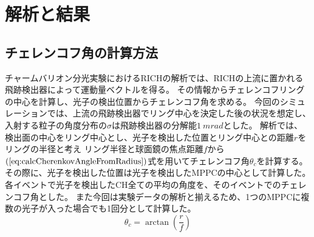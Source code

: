 \section{解析と結果}

\subsection{チェレンコフ角の計算方法}
チャームバリオン分光実験におけるRICHの解析では、RICHの上流に置かれる飛跡検出器によって運動量ベクトルを得る。
その情報からチェレンコフリングの中心を計算し、光子の検出位置からチェレンコフ角を求める。
今回のシミュレーションでは、上流の飛跡検出器でリング中心を決定した後の状況を想定し、
入射する粒子の角度分布の$\sigma$は飛跡検出器の分解能$\SI{1}{mrad}$とした。
解析では、検出面の中心をリング中心とし、光子を検出した位置とリング中心との距離$r$をリングの半径と考え
リング半径と球面鏡の焦点距離$f$から$(\ref{eq:calcCherenkovAngleFromRadius})$式を用いてチェレンコフ角$\theta_{c}$を計算する。
その際に、光子を検出した位置は光子を検出したMPPCの中心として計算した。
各イベントで光子を検出したCH全ての平均の角度を、そのイベントでのチェレンコフ角とした。
また今回は実験データの解析と揃えるため、1つのMPPCに複数の光子が入った場合でも1回分として計算した。
\begin{equation}
  \theta_{c} = \arctan{\left(\frac{r}{f}\right)}
  \label{eq:calcCherenkovAngleFromRadius}
\end{equation}

